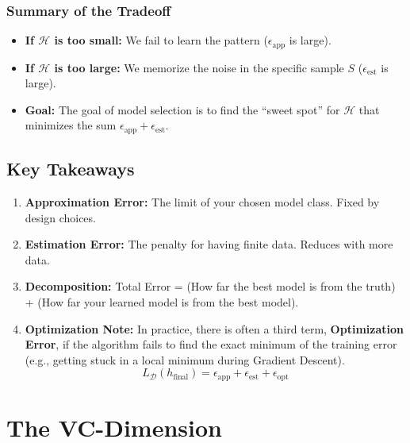 \documentclass[
  italian,
  11pt,
]{article}
\providecommand{\tightlist}{%
  \setlength{\itemsep}{0pt}\setlength{\parskip}{0pt}}
\begin{document}
\subsubsection{Summary of the Tradeoff}\label{summary-of-the-tradeoff}

\begin{itemize}
\tightlist
\item
  \textbf{If \(\mathcal{H}\) is too small:} We fail to learn the pattern
  (\(\epsilon_{\text{app}}\) is large).
\item
  \textbf{If \(\mathcal{H}\) is too large:} We memorize the noise in the
  specific sample \(S\) (\(\epsilon_{\text{est}}\) is large).
\item
  \textbf{Goal:} The goal of model selection is to find the ``sweet
  spot'' for \(\mathcal{H}\) that minimizes the sum
  \(\epsilon_{\text{app}} + \epsilon_{\text{est}}\).
\end{itemize}

\subsection{Key Takeaways}\label{key-takeaways-3}

\begin{enumerate}
\def\labelenumi{\arabic{enumi}.}
\tightlist
\item
  \textbf{Approximation Error:} The limit of your chosen model class.
  Fixed by design choices.
\item
  \textbf{Estimation Error:} The penalty for having finite data. Reduces
  with more data.
\item
  \textbf{Decomposition:} Total Error = (How far the best model is from
  the truth) + (How far your learned model is from the best model).
\item
  \textbf{Optimization Note:} In practice, there is often a third term,
  \textbf{Optimization Error}, if the algorithm fails to find the exact
  minimum of the training error (e.g., getting stuck in a local minimum
  during Gradient Descent).
  \[ L_{\mathcal{D}}(h_{\text{final}}) = \epsilon_{\text{app}} + \epsilon_{\text{est}} + \epsilon_{\text{opt}} \]
\end{enumerate}

\newpage

\section{The VC-Dimension}\label{the-vc-dimension}
\end{document}

